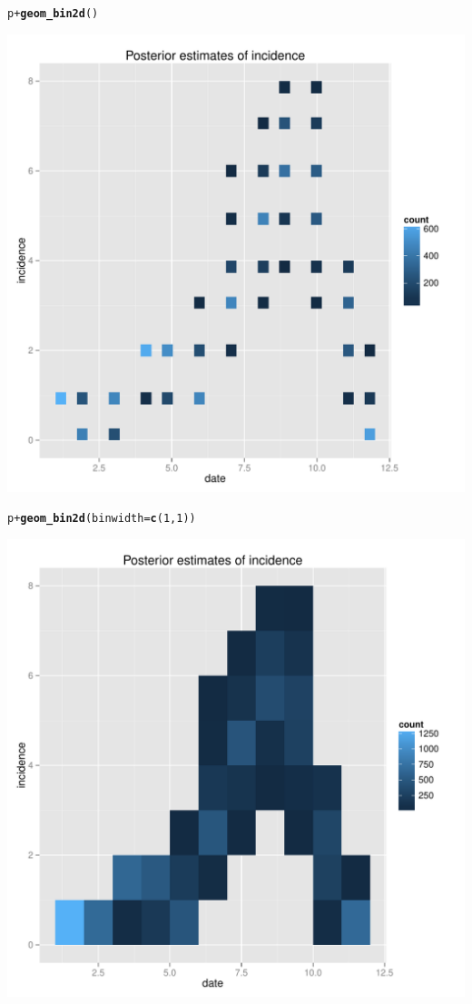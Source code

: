 \documentclass{article}\usepackage[]{graphicx}\usepackage[]{color}
\makeatletter
\newcommand{\hlnum}[1]{\textcolor[rgb]{0.686,0.059,0.569}{#1}}%
\newcommand{\hlopt}[1]{\textcolor[rgb]{0,0,0}{#1}}%
\newcommand{\hlstd}[1]{\textcolor[rgb]{0.345,0.345,0.345}{#1}}%
\newcommand{\hlkwc}[1]{\textcolor[rgb]{0.333,0.667,0.333}{#1}}%
\newcommand{\hlkwd}[1]{\textcolor[rgb]{0.737,0.353,0.396}{\textbf{#1}}}%
\newenvironment{kframe}{%
 \def\at@end@of@kframe{}%
 \ifinner\ifhmode%
  \def\at@end@of@kframe{\end{minipage}}%
  \begin{minipage}{\columnwidth}%
 \fi\fi%
 \def\FrameCommand##1{\hskip\@totalleftmargin \hskip-\fboxsep
 \colorbox{shadecolor}{##1}\hskip-\fboxsep
     \hskip-\linewidth \hskip-\@totalleftmargin \hskip\columnwidth}%
 \MakeFramed {\advance\hsize-\width
   \@totalleftmargin\z@ \linewidth\hsize
   \@setminipage}}%
 {\par\unskip\endMakeFramed%
 \at@end@of@kframe}
\newenvironment{knitrout}{}{} %
\makeatother
\begin{document}
\begin{knitrout}
\color{fgcolor}\begin{kframe}
\begin{alltt}
\hlstd{p} \hlopt{+} \hlkwd{geom_bin2d}\hlstd{()}
\end{alltt}
\end{kframe}

{\centering \includegraphics[width=.6\textwidth]{figs/unnamed-chunk-461} 

}


\begin{kframe}\begin{alltt}
\hlstd{p} \hlopt{+} \hlkwd{geom_bin2d}\hlstd{(}\hlkwc{binwidth}\hlstd{=}\hlkwd{c}\hlstd{(}\hlnum{1}\hlstd{,}\hlnum{1}\hlstd{))}
\end{alltt}
\end{kframe}

{\centering \includegraphics[width=.6\textwidth]{figs/unnamed-chunk-462} 

}



\end{knitrout}
\end{document}
